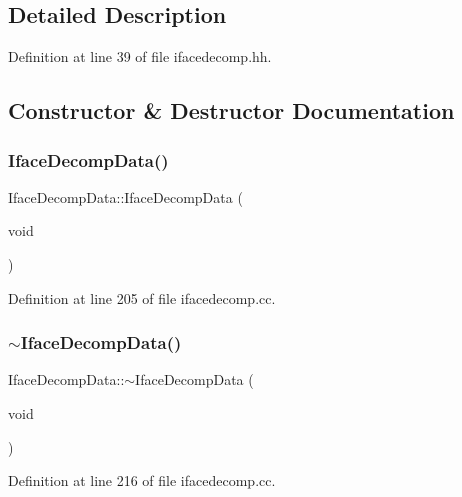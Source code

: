 \subsection{Detailed Description}


Definition at line 39 of file ifacedecomp.\+hh.



\subsection{Constructor \& Destructor Documentation}
\mbox{\label{class_iface_decomp_data_ad05817ffc163460e94cf21dbb481c805}} 
\subsubsection{\texorpdfstring{IfaceDecompData()}{IfaceDecompData()}}
{\footnotesize\ttfamily Iface\+Decomp\+Data\+::\+Iface\+Decomp\+Data (\begin{DoxyParamCaption}\item[{void}]{ }\end{DoxyParamCaption})}



Definition at line 205 of file ifacedecomp.\+cc.

\mbox{\label{class_iface_decomp_data_a17c03dc736086ab551cfe1c31f6d5260}} 
\subsubsection{\texorpdfstring{$\sim$IfaceDecompData()}{~IfaceDecompData()}}
{\footnotesize\ttfamily Iface\+Decomp\+Data\+::$\sim$\+Iface\+Decomp\+Data (\begin{DoxyParamCaption}\item[{void}]{ }\end{DoxyParamCaption})\hspace{0.3cm}{\ttfamily [virtual]}}



Definition at line 216 of file ifacedecomp.\+cc.



